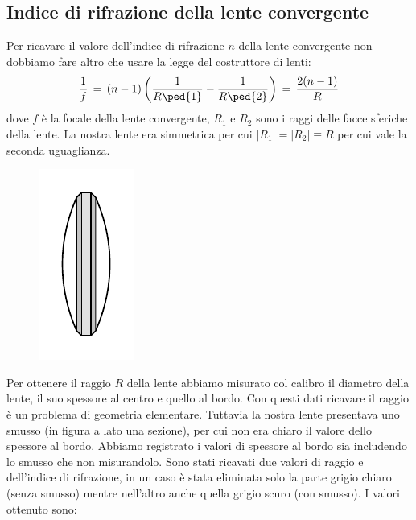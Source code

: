 

\subsection{Indice di rifrazione della lente convergente}

Per ricavare il valore dell'indice di rifrazione $n$ della lente convergente non dobbiamo fare altro che usare la legge del costruttore di lenti:
\begin{equation}
\frac{1}{f} \,=\, (n-1)\left(\frac{1}{R\ped{1}}-\frac{1}{R\ped{2}}\right) \,=\, \frac{2(n-1)}{R}
	\label{eq:costruttore}
\end{equation}
dove $f$ è la focale della lente convergente, $R_1$ e $R_2$ sono i raggi delle facce sferiche della lente. La nostra lente era simmetrica per cui $|R_1| = |R_2| \equiv R$ per cui vale la seconda uguaglianza.

\begin{figure}
  \begin{center}
    \includegraphics{lente.pdf}
  \end{center}
\end{figure}

Per ottenere il raggio $R$ della lente abbiamo misurato col calibro il diametro della lente, il suo spessore al centro e quello al bordo. Con questi dati ricavare il raggio è un problema di geometria elementare. Tuttavia la nostra lente presentava uno smusso (in figura a lato una sezione), per cui non era chiaro il valore dello spessore al bordo. Abbiamo registrato i valori di spessore al bordo sia includendo lo smusso che non misurandolo. Sono stati ricavati due valori di raggio e dell'indice di rifrazione, in un caso è stata eliminata solo la parte grigio chiaro (senza smusso) mentre nell'altro anche quella grigio scuro (con smusso). I valori ottenuto sono:

